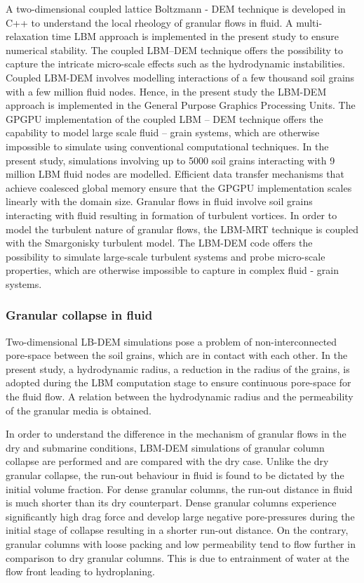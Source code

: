A two-dimensional coupled lattice Boltzmann - DEM technique is developed in C++ 
to understand the local rheology of granular flows in fluid. A multi-relaxation 
time LBM approach is implemented in the present study to ensure numerical 
stability. The coupled LBM--DEM technique offers the possibility to capture the 
intricate micro-scale effects such as the hydrodynamic instabilities. Coupled 
LBM-DEM involves modelling interactions of a few thousand soil grains with a 
few million fluid nodes. Hence, in the present study the LBM-DEM approach is 
implemented in the General Purpose Graphics Processing Units. The GPGPU 
implementation of the coupled LBM -- DEM technique offers the capability to 
model large scale fluid -- grain systems, which are otherwise impossible to 
simulate using conventional computational techniques. In the present study, 
simulations involving up to 5000 soil grains interacting with 9 million LBM 
fluid nodes are modelled. Efficient data transfer mechanisms that achieve 
coalesced global memory ensure that the GPGPU implementation scales linearly 
with the domain size. Granular flows in fluid involve soil grains interacting 
with fluid resulting in formation of turbulent vortices. In order to model the 
turbulent nature of granular flows, the LBM-MRT technique is coupled with the 
Smargonisky turbulent model. The LBM-DEM code offers the possibility to 
simulate large-scale turbulent systems and probe micro-scale properties, which 
are otherwise impossible to capture in complex fluid - grain systems.

\subsubsection*{Granular collapse in fluid}

Two-dimensional LB-DEM simulations pose a problem of non-interconnected 
pore-space between the soil grains, which are in contact with each other. In 
the present study, a hydrodynamic radius, a reduction in the radius of the 
grains, is adopted during the LBM computation stage to ensure continuous 
pore-space for the fluid flow. A relation between the hydrodynamic radius and 
the permeability of the granular media is obtained. 

In order to understand the difference in the mechanism of granular flows in the 
dry and submarine conditions, LBM-DEM simulations of granular column collapse 
are performed and are compared with the dry case. Unlike the dry granular 
collapse, the run-out behaviour in fluid is found to be dictated by the initial 
volume fraction. For dense granular columns, the run-out distance in fluid is 
much shorter than its dry counterpart. Dense granular columns experience 
significantly high drag force and develop large negative pore-pressures during 
the initial stage of collapse resulting in a shorter run-out distance. On the 
contrary, granular columns with loose packing and low permeability tend to flow 
further in comparison to dry granular columns. This is due to entrainment of 
water at the flow front leading to hydroplaning. 

